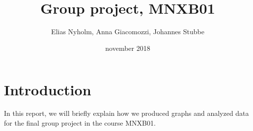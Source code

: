 \documentclass{article}
\title{Group project, MNXB01}
\author{Elias Nyholm, Anna Giacomozzi, Johannes Stubbe}
\date{november 2018}
\begin{document}
\maketitle

\newpage

\section*{Introduction}
In this report, we will briefly explain how we produced graphs and analyzed data for the final group project in the course MNXB01.
\end{document}

